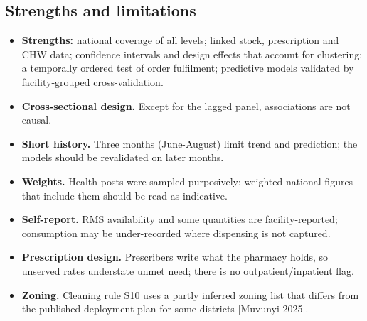 \documentclass[10pt,a4paper]{article}
\begin{document}
\subsection{Strengths and limitations}
\begin{itemize}\item \textbf{Strengths:} national coverage of all levels; linked stock, prescription and CHW data; confidence intervals and design effects that account for clustering; a temporally ordered test of order fulfilment; predictive models validated by facility-grouped cross-validation.
\item \textbf{Cross-sectional design.} Except for the lagged panel, associations are not causal.
\item \textbf{Short history.} Three months (June-August) limit trend and prediction; the models should be revalidated on later months.
\item \textbf{Weights.} Health posts were sampled purposively; weighted national figures that include them should be read as indicative.
\item \textbf{Self-report.} RMS availability and some quantities are facility-reported; consumption may be under-recorded where dispensing is not captured.
\item \textbf{Prescription design.} Prescribers write what the pharmacy holds, so unserved rates understate unmet need; there is no outpatient/inpatient flag.
\item \textbf{Zoning.} Cleaning rule S10 uses a partly inferred zoning list that differs from the published deployment plan for some districts [Muvunyi 2025].
\end{itemize}
\end{document}
